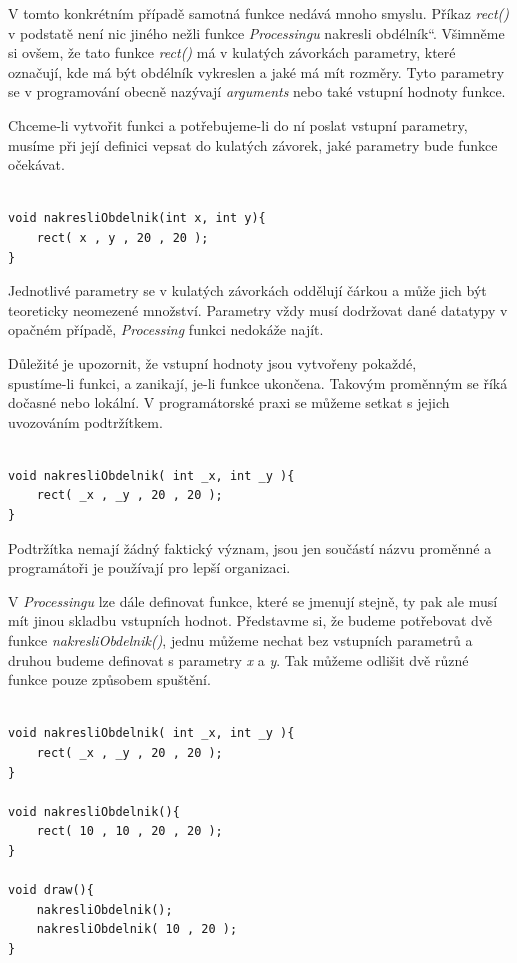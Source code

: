 \documentclass[10pt,twoside=true,open=right,cleardoublepage=empty,chapterprefix=true]{scrbook}
\renewcommand\uv[1]{\quotedblbase #1\textquotedblleft}%
\newcommand{\vyraz}[1]{\textit{\gls{#1}}\index{#1}\label{#1}}
\begin{document}
V tomto konkrétním případě samotná funkce nedává mnoho smyslu. Příkaz \vyraz{rect()} v podstatě není nic jiného nežli funkce {\em Processingu} \uv{nakresli obdélník}. Všimněme si ovšem, že tato funkce \vyraz{rect()} má v kulatých závorkách parametry, které označují, kde má být obdélník vykreslen a jaké má mít rozměry. Tyto parametry se v programování obecně nazývají {\em arguments} nebo také vstupní hodnoty funkce.

Chceme-li vytvořit funkci a potřebujeme-li do ní poslat vstupní parametry, musíme při její definici vepsat do kulatých závorek, jaké parametry bude funkce očekávat.


\begin{lstlisting}

void nakresliObdelnik(int x, int y){
	rect( x , y , 20 , 20 );
}

\end{lstlisting}

Jednotlivé parametry se v kulatých závorkách oddělují čárkou a může jich být teoreticky neomezené množství. Parametry vždy musí dodržovat dané datatypy v opačném případě, {\em Processing} funkci nedokáže najít.

Důležité je upozornit, že vstupní hodnoty jsou vytvořeny pokaždé, \\spustíme-li funkci, a zanikají, je-li funkce ukončena. Takovým proměnným se říká dočasné nebo lokální. V programátorské praxi se můžeme setkat s jejich uvozováním podtržítkem.


\begin{lstlisting}

void nakresliObdelnik( int _x, int _y ){
	rect( _x , _y , 20 , 20 );
}

\end{lstlisting}

Podtržítka nemají žádný faktický význam, jsou jen součástí názvu proměnné a programátoři je používají pro lepší organizaci.

V {\em Processingu} lze dále definovat funkce, které se jmenují stejně, ty pak ale musí mít jinou skladbu vstupních hodnot. Představme si, že budeme potřebovat dvě funkce {\em nakresliObdelnik()}, jednu můžeme nechat bez vstupních parametrů a druhou budeme definovat s parametry {\em x} a {\em y}. Tak můžeme odlišit dvě různé funkce pouze způsobem spuštění.
\newpage

\begin{lstlisting}

void nakresliObdelnik( int _x, int _y ){
	rect( _x , _y , 20 , 20 );
}

void nakresliObdelnik(){
	rect( 10 , 10 , 20 , 20 );
}

void draw(){
	nakresliObdelnik();
	nakresliObdelnik( 10 , 20 );
}

\end{lstlisting}
\end{document}
